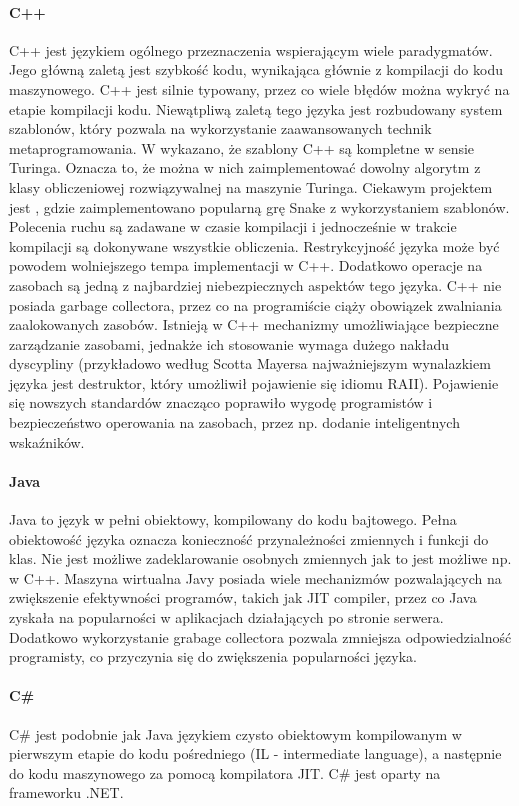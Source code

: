 \documentclass[12pt]{article}
\begin{document}
\paragraph{C++}
C++ jest językiem ogólnego przeznaczenia wspierającym wiele paradygmatów. Jego główną zaletą jest szybkość kodu, wynikająca głównie z kompilacji do kodu maszynowego. C++ jest silnie typowany, przez co wiele błędów można wykryć na etapie kompilacji kodu. Niewątpliwą zaletą tego języka jest rozbudowany system szablonów, który pozwala na wykorzystanie zaawansowanych technik metaprogramowania. W \cite{Cpp_turing_complete} wykazano, że szablony C++ są kompletne w sensie Turinga. Oznacza to, że można w nich zaimplementować dowolny algorytm z klasy obliczeniowej rozwiązywalnej na maszynie Turinga. Ciekawym projektem jest \cite{Cpp_snake_compile_time}, gdzie zaimplementowano popularną grę Snake z wykorzystaniem szablonów. Polecenia ruchu są zadawane w czasie kompilacji i jednocześnie w trakcie kompilacji są dokonywane wszystkie obliczenia. Restrykcyjność języka może być powodem wolniejszego tempa implementacji w C++. Dodatkowo operacje na zasobach są jedną z najbardziej niebezpiecznych aspektów tego języka. C++ nie posiada garbage collectora, przez co na programiście ciąży obowiązek zwalniania zaalokowanych zasobów. Istnieją w C++ mechanizmy umożliwiające bezpieczne zarządzanie zasobami, jednakże ich stosowanie wymaga dużego nakładu dyscypliny (przykładowo według Scotta Mayersa najważniejszym wynalazkiem języka jest destruktor, który umożliwił pojawienie się idiomu RAII). Pojawienie się nowszych standardów znacząco poprawiło wygodę programistów i bezpieczeństwo operowania na zasobach, przez np. dodanie inteligentnych wskaźników.

\paragraph{Java}
Java to język w pełni obiektowy, kompilowany do kodu bajtowego. Pełna obiektowość języka oznacza konieczność przynależności zmiennych i funkcji do klas. Nie jest możliwe zadeklarowanie osobnych zmiennych jak to jest możliwe np. w C++. Maszyna wirtualna Javy posiada wiele mechanizmów pozwalających na zwiększenie efektywności programów, takich jak JIT compiler, przez co Java zyskała na popularności w aplikacjach działających po stronie serwera. Dodatkowo wykorzystanie grabage collectora pozwala zmniejsza odpowiedzialność programisty, co przyczynia się do zwiększenia popularności języka.

\paragraph{C\#}
C\# jest podobnie jak Java językiem czysto obiektowym kompilowanym w pierwszym etapie do kodu pośredniego (IL - intermediate language), a następnie do kodu maszynowego za pomocą kompilatora JIT. C\# jest oparty na frameworku .NET.
\end{document}
